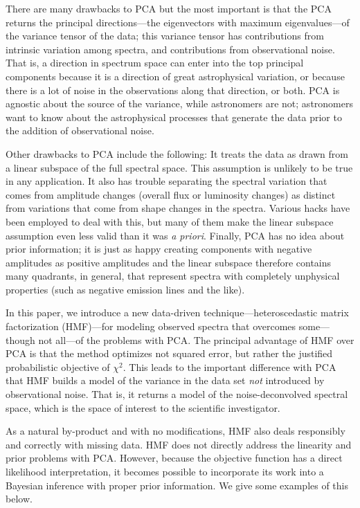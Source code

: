 \documentclass[apj]{emulateapj}
\begin{document}
There are many drawbacks to PCA but the most important is that the PCA
returns the principal directions---the eigenvectors with maximum
eigenvalues---of the variance tensor of the data; this variance tensor
has contributions from intrinsic variation among spectra, and
contributions from observational noise.  That is, a direction in
spectrum space can enter into the top principal components because it
is a direction of great astrophysical variation, or because there is a
lot of noise in the observations along that direction, or both.  PCA
is agnostic about the source of the variance, while astronomers are
not; astronomers want to know about the astrophysical processes that
generate the data prior to the addition of observational noise.

Other drawbacks to PCA include the following: It treats the data as
drawn from a linear subspace of the full spectral space. This
assumption is unlikely to be true in any application.  It also has
trouble separating the spectral variation that comes from amplitude
changes (overall flux or luminosity changes) as distinct from
variations that come from shape changes in the spectra.  Various hacks
have been employed to deal with this, but many of them make the linear
subspace assumption even less valid than it was \textit{a
  priori}. Finally, PCA has no idea about prior information; it is
just as happy creating components with negative amplitudes as positive
amplitudes and the linear subspace therefore contains many quadrants,
in general, that represent spectra with completely unphysical
properties (such as negative emission lines and the like).

In this paper, we introduce a new data-driven
technique---heteroscedastic matrix factorization (HMF)---for modeling
observed spectra that overcomes some---though not all---of the
problems with PCA.  The principal advantage of HMF over PCA is that
the method optimizes not squared error, but rather the justified
probabilistic objective of $\chi^2$.  This leads to the important
difference with PCA that HMF builds a model of the variance in the
data set \emph{not} introduced by observational noise.  That is, it
returns a model of the noise-deconvolved spectral space, which is the
space of interest to the scientific investigator.

As a natural by-product and with no modifications, HMF also deals
responsibly and correctly with missing data.  HMF does not directly
address the linearity and prior problems with PCA.  However, because
the objective function has a direct likelihood interpretation, it
becomes possible to incorporate its work into a Bayesian inference
with proper prior information.  We give some examples of this below.
\end{document}
